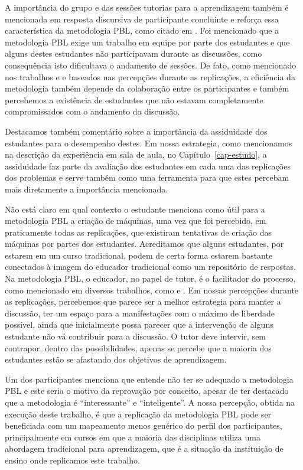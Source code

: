 A importância do grupo e das sessões tutorias para a aprendizagem
também é mencionada em resposta discursiva de participante concluinte
e reforça essa característica da metodologia \ac{PBL}, como citado
em \cite{van2000motivation}.
Foi mencionado que a metodologia \ac{PBL} exige um trabalho em equipe por
parte dos estudantes e que alguns destes estudantes não participavam
durante as discussões, como consequência isto dificultava o
andamento de sessões.
De fato, como mencionado nos
trabalhos \cite{savery2015overview} e \cite{albanese2010problem}
e baseados nas percepções durante as replicações, a eficiência da metodologia
também depende da colaboração entre os participantes e
também percebemos a existência de estudantes que não estavam
completamente compromissados com o andamento da discussão.

Destacamos também comentário sobre a importância da assiduidade dos
estudantes para o desempenho destes.
Em nossa estrategia, como mencionamos na descrição da experiência
em sala de aula, no Capítulo~\ref{cap-estudo}, a assiduidade faz
parte da avaliação dos estudantes em cada uma das replicações dos
problemas e serve também como uma ferramenta para que estes
percebam mais diretamente a importância mencionada.

Não está claro em qual contexto o estudante menciona como útil
para a metodologia \ac{PBL} a criação de máquinas, uma vez que
foi percebido, em praticamente todas as replicações, que
existiram tentativas de criação das máquinas por partes
dos estudantes.
Acreditamos que alguns estudantes, por estarem em um curso
tradicional, podem de certa forma estarem bastante conectados
à imagem do educador tradicional como um repositório de
respostas.
Na metodologia \ac{PBL}, o educador, no papel de tutor, é o facilitador
do processo, como mencionado em diversos trabalhos, como
\cite{hmelo2004problem} e \cite{savery2015overview}.
Em nossas percepções durante as replicações, percebemos que
parece ser a melhor estrategia para manter a discussão, ter um
espaço para a manifestações com o máximo de liberdade possível,
ainda que inicialmente possa parecer que a intervenção
de alguns estudante não vá contribuir para
a discussão.
O tutor deve intervir, sem contrapor, dentro das possibilidades,
apenas se percebe que a maioria dos estudantes estão se afastando
dos objetivos de aprendizagem.

Um dos participantes menciona que entende não ter se adequado
a metodologia \ac{PBL} e este seria o motivo da reprovação por conceito,
apesar de ter destacado que a metodologia é ``interessante'' e ``inteligente''.
A nossa percepção, obtida na execução deste trabalho, é que a replicação
da metodologia \ac{PBL} pode ser beneficiada com um mapeamento menos genérico
do perfil dos participantes, principalmente em cursos em que a maioria
das disciplinas utiliza uma abordagem tradicional para aprendizagem, que
é a situação da instituição de ensino onde replicamos este trabalho.


